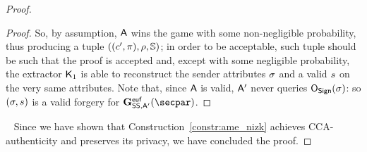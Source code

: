 \begin{proof}
\begin{lemma}
\begin{proof}
            So, by assumption, $\mathsf{A}$ wins the game with some non-negligible probability, thus producing a tuple $((c', \pi), \rho, \mathbb{S})$; in order to be acceptable, such tuple should be such that the proof is accepted and, except with some negligible probability, the extractor $\mathsf{K}_1$ is able to reconstruct the sender attributes $\sigma$ and a valid $s$ on the very same attributes.
            Note that, since $\mathsf{A}$ is valid, $\mathsf{A}'$ never queries $\mathsf{O}_{\mathsf{Sign}}(\sigma)$: so $(\sigma, s)$ is a valid forgery for $\Sigeufgame_{\sig, \adversary'}(\secpar)$.
        \end{proof}
    \end{lemma}
    ~\newline
    Since we have shown that Construction~\ref{constr:ame_nizk} achieves CCA-authenticity and preserves its privacy, we have concluded the proof.
\end{proof}
